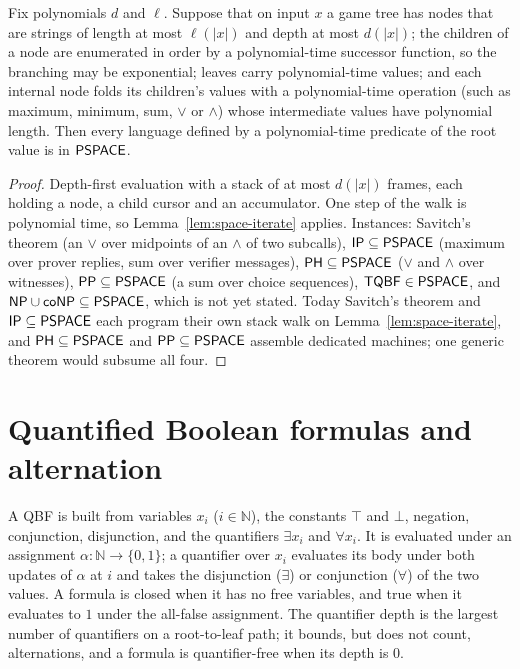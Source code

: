 \begin{theorem}
  \label{thm:space-game-tree}
  Fix polynomials $d$ and $\ell$. Suppose that on input $x$ a game tree has
  nodes that are strings of length at most $\ell(|x|)$ and depth at most
  $d(|x|)$; the children of a node are enumerated in order by a polynomial-time
  successor function, so the branching may be exponential; leaves carry
  polynomial-time values; and each internal node folds its children's values
  with a polynomial-time operation (such as maximum, minimum, sum, $\vee$ or
  $\wedge$) whose intermediate values have polynomial length. Then every
  language defined by a polynomial-time predicate of the root value is in
  $\mathsf{PSPACE}$.
\end{theorem}
\begin{proof}
  Depth-first evaluation with a stack of at most $d(|x|)$ frames, each holding
  a node, a child cursor and an accumulator. One step of the walk is
  polynomial time, so Lemma~\ref{lem:space-iterate} applies. Instances:
  Savitch's theorem (an $\vee$ over midpoints of an $\wedge$ of two subcalls),
  $\mathsf{IP} \subseteq \mathsf{PSPACE}$ (maximum over prover replies, sum over
  verifier messages), $\mathsf{PH} \subseteq \mathsf{PSPACE}$ ($\vee$ and $\wedge$ over
  witnesses), $\mathsf{PP} \subseteq \mathsf{PSPACE}$ (a sum over choice sequences),
  $\mathsf{TQBF} \in \mathsf{PSPACE}$, and $\mathsf{NP} \cup \mathsf{coNP} \subseteq
  \mathsf{PSPACE}$, which is not yet stated. Today Savitch's theorem and
  $\mathsf{IP} \subseteq \mathsf{PSPACE}$ each program their own stack walk on
  Lemma~\ref{lem:space-iterate}, and $\mathsf{PH} \subseteq \mathsf{PSPACE}$ and
  $\mathsf{PP} \subseteq \mathsf{PSPACE}$ assemble dedicated machines; one generic
  theorem would subsume all four.
\end{proof}

\section{Quantified Boolean formulas and alternation}

\begin{definition}
  \label{def:space-qbf}
  \leanok
  A QBF is built from variables $x_i$ ($i \in \mathbb{N}$), the constants
  $\top$ and $\bot$, negation, conjunction, disjunction, and the quantifiers
  $\exists x_i$ and $\forall x_i$. It is evaluated under an assignment
  $\alpha : \mathbb{N} \to \{0,1\}$; a quantifier over $x_i$ evaluates its body
  under both updates of $\alpha$ at $i$ and takes the disjunction ($\exists$)
  or conjunction ($\forall$) of the two values. A formula is closed when it has
  no free variables, and true when it evaluates to $1$ under the all-false
  assignment. The quantifier depth is the largest number of quantifiers on a
  root-to-leaf path; it bounds, but does not count, alternations, and a
  formula is quantifier-free when its depth is $0$.
\end{definition}

